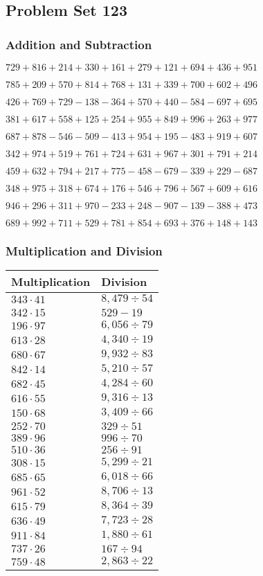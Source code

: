 \hypertarget{problem-set-123}{%
\subsection{Problem Set 123}\label{problem-set-123}}

\hypertarget{addition-and-subtraction}{%
\subsubsection{Addition and
Subtraction}\label{addition-and-subtraction}}

\(729 +816 +214 +330 +161 +279 +121 +694 +436 +951\)

\(785 +209 +570 +814 +768 +131 +339 +700 +602 +496\)

\(426 +769 +729 - 138 - 364 +570 +440 - 584 - 697 +695\)

\(381 +617 +558 +125 +254 +955 +849 +996 +263 +977\)

\(687 +878 - 546 - 509 - 413 +954 +195 - 483 +919 +607\)

\(342 +974 +519 +761 +724 +631 +967 +301 +791 +214\)

\(459 +632 +794 +217 +775 - 458 - 679 - 339 +229 - 687\)

\(348 +975 +318 +674 +176 +546 +796 +567 +609 +616\)

\(946 +296 +311 +970 - 233 +248 - 907 - 139 - 388 +473\)

\(689 +992 +711 +529 +781 +854 +693 +376 +148 +143\)

\hypertarget{multiplication-and-division}{%
\subsubsection{Multiplication and
Division}\label{multiplication-and-division}}

\begin{longtable}[]{@{}ll@{}}
\toprule
Multiplication & Division\tabularnewline
\midrule
\endhead
\(343 \cdot 41\) & \(8,479÷54\)\tabularnewline
\(342 \cdot 15\) & \(529 - 19\)\tabularnewline
\(196 \cdot 97\) & \(6,056÷79\)\tabularnewline
\(613 \cdot 28\) & \(4,340÷19\)\tabularnewline
\(680 \cdot 67\) & \(9,932÷83\)\tabularnewline
\(842 \cdot 14\) & \(5,210÷57\)\tabularnewline
\(682 \cdot 45\) & \(4,284÷60\)\tabularnewline
\(616 \cdot 55\) & \(9,316÷13\)\tabularnewline
\(150 \cdot 68\) & \(3,409÷66\)\tabularnewline
\(252 \cdot 70\) & \(329÷51\)\tabularnewline
\(389 \cdot 96\) & \(996÷70\)\tabularnewline
\(510 \cdot 36\) & \(256÷91\)\tabularnewline
\(308 \cdot 15\) & \(5,299÷21\)\tabularnewline
\(685 \cdot 65\) & \(6,018÷66\)\tabularnewline
\(961 \cdot 52\) & \(8,706÷13\)\tabularnewline
\(615 \cdot 79\) & \(8,364÷39\)\tabularnewline
\(636 \cdot 49\) & \(7,723÷28\)\tabularnewline
\(911 \cdot 84\) & \(1,880÷61\)\tabularnewline
\(737 \cdot 26\) & \(167÷94\)\tabularnewline
\(759 \cdot 48\) & \(2,863÷22\)\tabularnewline
\bottomrule
\end{longtable}
